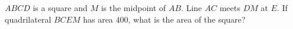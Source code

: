 $ABCD$ is a square and $M$ is the midpoint of $AB$. Line $AC$ meets $DM$ at $E$. If quadrilateral $BCEM$ has area $400$, what is the area of the square?
